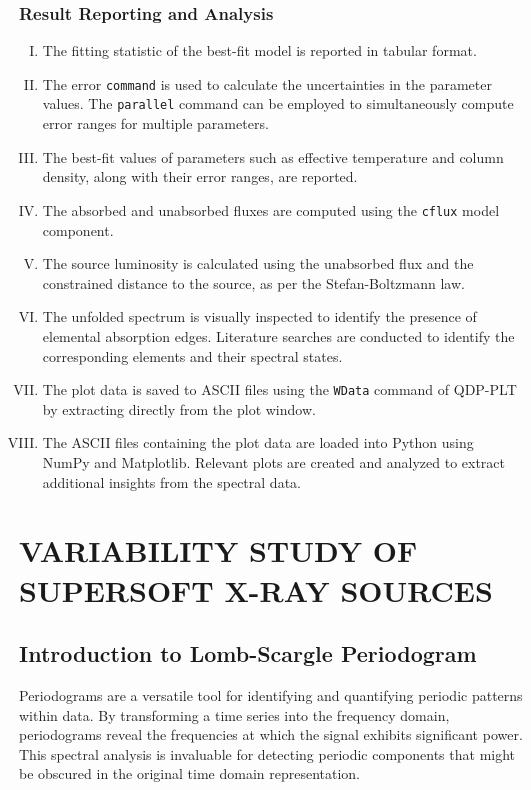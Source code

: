 			\subsubsection{Result Reporting and Analysis}
				\begin{enumerate}[I.]
					\item The fitting statistic of the best-fit model is reported in tabular format.
					\item The error \texttt{command} is used to calculate the uncertainties in the parameter values. The \texttt{parallel} command can be employed to simultaneously compute error ranges for multiple parameters.
					\item The best-fit values of parameters such as effective temperature and column density, along with their error ranges, are reported.
					\item The absorbed and unabsorbed fluxes are computed using the \texttt{cflux} model component.
					\item The source luminosity is calculated using the unabsorbed flux and the constrained distance to the source, as per the Stefan-Boltzmann law.
					\item The unfolded spectrum is visually inspected to identify the presence of elemental absorption edges. Literature searches are conducted to identify the corresponding elements and their spectral states.
					\item The plot data is saved to ASCII files using the \texttt{WData} command of QDP-PLT by extracting directly from the plot window.
					\item The ASCII files containing the plot data are loaded into Python using NumPy and Matplotlib. Relevant plots are created and analyzed to extract additional insights from the spectral data.
				\end{enumerate}
			

    \section{\MakeUppercase{Variability Study of Supersoft X-ray Sources}} \label{methodology:variability}
    
    	\subsection{Introduction to Lomb-Scargle Periodogram}
    		Periodograms are a versatile tool for identifying and quantifying periodic patterns within data. By transforming a time series into the frequency domain, periodograms reveal the frequencies at which the signal exhibits significant power. This spectral analysis is invaluable for detecting periodic components that might be obscured in the original time domain representation.
    		
